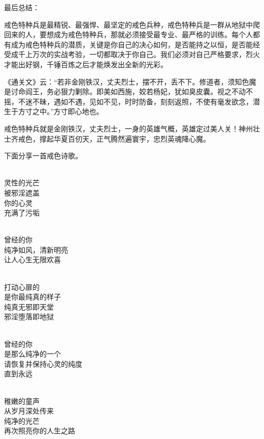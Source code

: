 最后总结：

戒色特种兵是最精锐、最强悍、最坚定的戒色兵种，戒色特种兵是一群从地狱中爬回来的人，要想成为戒色特种兵，那就必须接受最专业、最严格的训练。每个人都有成为戒色特种兵的潜质，关键是你自己的决心如何，是否能持之以恒，是否能经受成千上万次的实战考验，一切都取决于你自己。我们必须对自己严格要求，烈火才能出好钢，千锤百炼之后才能焕发出全新的光彩。

《通关文》云：“若非金刚铁汉，丈夫烈士，摆不开，丢不下。修道者，须知色魔是讨命阎王，务必狠力剿除。即美如西施，姣若杨妃，犹如臭皮囊。视之不动不摇，不迷不昧，遇如不遇，见如不见，时时防备，刻刻返照，不使有毫发欲念，潜生于方寸之中。”方寸即心地也。

戒色特种兵就是金刚铁汉，丈夫烈士，一身的英雄气概，英雄定过美人关！神州壮士齐戒色，撑起华夏百仞天，正气腾然遍寰宇，忠烈英魂降心魔。

下面分享一首戒色诗歌。

\begin{poem}[消逝的光芒]
    \begin{multicols}{2}
        \begin{center}~\\
            灵性的光芒 \\ 被邪淫遮盖 \\ 你的心灵 \\ 充满了污垢

            ~\\

            曾经的你 \\ 纯净如风，清新明亮 \\ 让人心生无限欢喜

            ~\\

            打动心扉的 \\ 是你最纯真的样子 \\ 纯真无邪即天堂 \\ 邪淫堕落即地狱

            ~\\

            曾经的你 \\ 是那么纯净的一个 \\ 请恢复并保持心灵的纯度 \\ 直到永远

            ~\\

            稚嫩的童声 \\ 从岁月深处传来 \\ 纯净的光芒 \\ 再次照亮你的人生之路
        \end{center}
    \end{multicols}
\end{poem}

